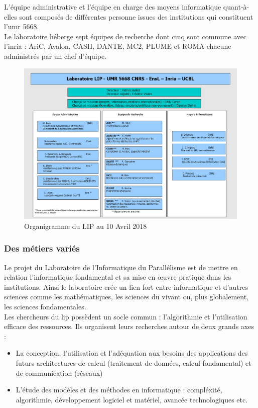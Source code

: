 L'équipe administrative et l'équipe en charge des moyens informatique quant-à-elles sont composés de différentes personne issues des institutions qui constituent l'\gls{umr} 5668.\\

Le laboratoire héberge sept équipes de recherche dont cinq sont commune avec l'\gls{inria} : AriC, Avalon, CASH, DANTE, MC2, PLUME et ROMA chacune administrés par un chef d'équipe.

\begin{figure}[h]
	\center
	\includegraphics[scale=0.58]{partie1/images/organigramme.png}
	\caption{Organigramme du LIP au 10 Avril 2018 \cite{organigramme}}
\end{figure}
\subsubsection{Des métiers variés}
Le projet du Laboratoire de l'Informatique du Parallélisme est de mettre en relation l'informatique fondamental et sa mise en œuvre pratique dans les institutions. Ainsi le laboratoire crée un lien fort entre informatique et d'autres sciences comme les mathématiques, les sciences du vivant ou, plus globalement, les sciences fondamentales.\cite{presUCBL}\\

Les chercheurs du \gls{lip} possèdent un socle commun : l'algorithmie et l'utilisation efficace des ressources. Ils organisent leurs recherches autour de deux grands axes :
\begin{itemize}
	\item La conception, l'utilisation et l'adéquation aux besoins des applications des futurs architectures de calcul (traitement de données, calcul fondamental) et de communication (réseaux)
	\item L'étude des modèles et des méthodes en informatique : compléxité, algorithmie, développement logiciel et matériel, avancée technologiques etc.\\
\end{itemize}

